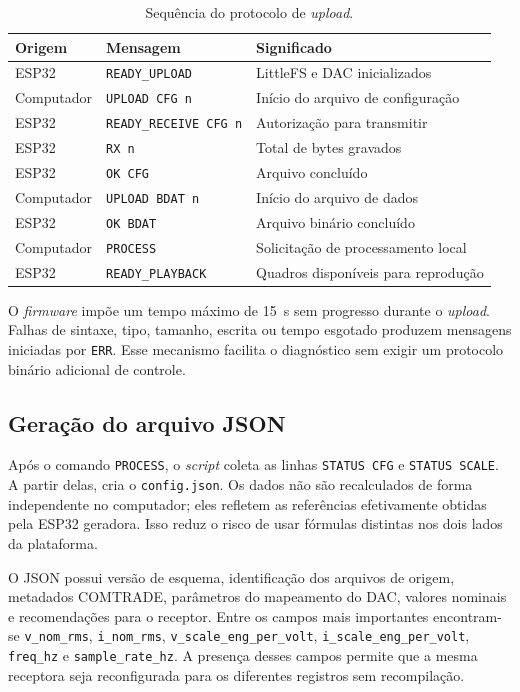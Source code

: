 \begin{table}[H]
  \centering
  \small
  \caption{Sequência do protocolo de \textit{upload}.}
  \label{tab:protocolo-upload}
  \begin{tabular}{p{3.0cm}p{4.6cm}p{5.2cm}}
    \toprule
    Origem & Mensagem & Significado \\
    \midrule
    ESP32 & \texttt{READY\_UPLOAD} & LittleFS e DAC inicializados \\
    Computador & \texttt{UPLOAD CFG n} & Início do arquivo de configuração \\
    ESP32 & \texttt{READY\_RECEIVE CFG n} & Autorização para transmitir \\
    ESP32 & \texttt{RX n} & Total de bytes gravados \\
    ESP32 & \texttt{OK CFG} & Arquivo concluído \\
    Computador & \texttt{UPLOAD BDAT n} & Início do arquivo de dados \\
    ESP32 & \texttt{OK BDAT} & Arquivo binário concluído \\
    Computador & \texttt{PROCESS} & Solicitação de processamento local \\
    ESP32 & \texttt{READY\_PLAYBACK} & Quadros disponíveis para reprodução \\
    \bottomrule
  \end{tabular}
\end{table}

O \textit{firmware} impõe um tempo máximo de \SI{15}{\second} sem progresso durante o \textit{upload}. Falhas de sintaxe, tipo, tamanho, escrita ou tempo esgotado produzem mensagens iniciadas por \texttt{ERR}. Esse mecanismo facilita o diagnóstico sem exigir um protocolo binário adicional de controle.

\subsection{Geração do arquivo JSON}

Após o comando \texttt{PROCESS}, o \textit{script} coleta as linhas \texttt{STATUS CFG} e \texttt{STATUS SCALE}. A partir delas, cria o \texttt{config.json}. Os dados não são recalculados de forma independente no computador; eles refletem as referências efetivamente obtidas pela ESP32 geradora. Isso reduz o risco de usar fórmulas distintas nos dois lados da plataforma.

O JSON possui versão de esquema, identificação dos arquivos de origem, metadados COMTRADE, parâmetros do mapeamento do DAC, valores nominais e recomendações para o receptor. Entre os campos mais importantes encontram-se \texttt{v\_nom\_rms}, \texttt{i\_nom\_rms}, \texttt{v\_scale\_eng\_per\_volt}, \texttt{i\_scale\_eng\_per\_volt}, \texttt{freq\_hz} e \texttt{sample\_rate\_hz}. A presença desses campos permite que a mesma receptora seja reconfigurada para os diferentes registros sem recompilação.

